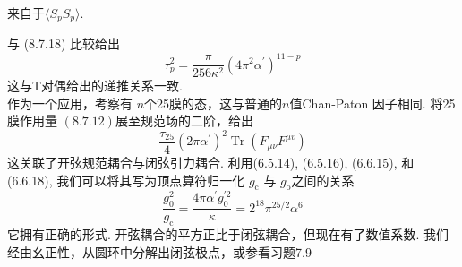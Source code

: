 \begin{remark}
来自于$\langle S_p S_p \rangle$.
\end{remark}
与 (8.7.18) 比较给出
\begin{equation}
	\tau_{p}^{2}=\frac{\pi}{256 \kappa^{2}}\left(4 \pi^{2} \alpha^{\prime}\right)^{11-p}
\end{equation}
这与T对偶给出的递推关系一致.\\
作为一个应用，考察有 $n $个25膜的态，这与普通的$n $值Chan-Paton 因子相同. 将25膜作用量 $(8.7 .12)$展至规范场的二阶，给出
\begin{equation}
	\frac{\tau_{25}}{4}\left(2 \pi \alpha^{\prime}\right)^{2} \operatorname{Tr}\left(F_{\mu \nu} F^{\mu v}\right)
\end{equation}
这关联了开弦规范耦合与闭弦引力耦合. 利用(6.5.14), (6.5.16), (6.6.15), 和 (6.6.18), 我们可以将其写为顶点算符归一化 $g_{\mathrm{c}}$ 与 $g_{\mathrm{o}}$之间的关系
\begin{equation}
	\frac{g_{0}^{2}}{g_{\mathrm{c}}}=\frac{4 \pi \alpha^{\prime} g_{0}^{\prime 2}}{\kappa}=2^{18} \pi^{25 / 2} \alpha^{6}
\end{equation}
它拥有正确的形式. 开弦耦合的平方正比于闭弦耦合，但现在有了数值系数. 我们经由幺正性，从圆环中分解出闭弦极点，或参看习题7.9



